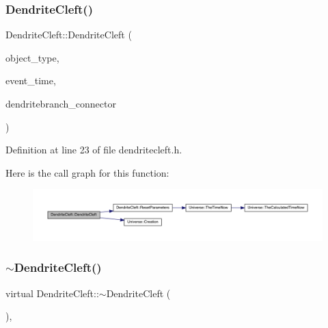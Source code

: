 \subsubsection{\texorpdfstring{Dendrite\+Cleft()}{DendriteCleft()}\hspace{0.1cm}{\footnotesize\ttfamily [4/4]}}
{\footnotesize\ttfamily Dendrite\+Cleft\+::\+Dendrite\+Cleft (\begin{DoxyParamCaption}\item[{unsigned int}]{object\+\_\+type,  }\item[{std\+::chrono\+::time\+\_\+point$<$ \hyperlink{universe_8h_a0ef8d951d1ca5ab3cfaf7ab4c7a6fd80}{Clock} $>$}]{event\+\_\+time,  }\item[{\hyperlink{class_dendrite_branch}{Dendrite\+Branch} \&}]{dendritebranch\+\_\+connector }\end{DoxyParamCaption})\hspace{0.3cm}{\ttfamily [inline]}}



Definition at line 23 of file dendritecleft.\+h.

Here is the call graph for this function\+:
\nopagebreak
\begin{figure}[H]
\begin{center}
\leavevmode
\includegraphics[width=350pt]{class_dendrite_cleft_abcb81284cd9bd7ee2863eecfb6b59f62_cgraph}
\end{center}
\end{figure}
\mbox{\label{class_dendrite_cleft_ad99958c45fa63f2f68b65d7e5ba45b32}} 
\subsubsection{\texorpdfstring{$\sim$\+Dendrite\+Cleft()}{~DendriteCleft()}}
{\footnotesize\ttfamily virtual Dendrite\+Cleft\+::$\sim$\+Dendrite\+Cleft (\begin{DoxyParamCaption}{ }\end{DoxyParamCaption})\hspace{0.3cm}{\ttfamily [inline]}, {\ttfamily [virtual]}}

